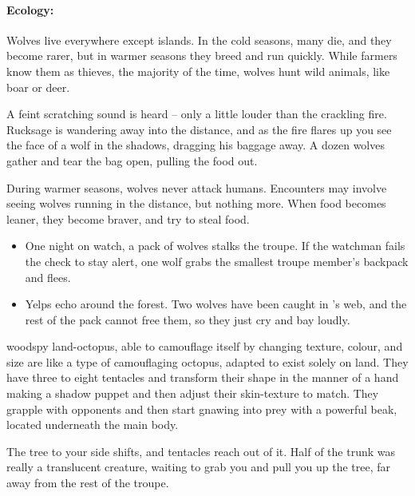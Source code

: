 \begin{multicols}{2}
\paragraph{Ecology:} Wolves live everywhere except islands.
In the cold seasons, many die, and they become rarer, but in warmer seasons they breed and run quickly.
While farmers know them as thieves, the majority of the time, wolves hunt wild animals, like boar or deer.

\begin{boxtext}
  A feint scratching sound is heard -- only a little louder than the crackling fire.
  Rucksage is wandering away into the distance, and as the fire flares up you see the face of a wolf in the shadows, dragging his baggage away.
  A dozen wolves gather and tear the bag open, pulling the food out.
\end{boxtext}


\showEnc
During warmer seasons, wolves never attack humans.
Encounters may involve seeing wolves running in the distance, but nothing more.
When food becomes leaner, they become braver, and try to steal food.

\begin{itemize}
  \item
  One night on watch, a pack of wolves stalks the troupe.
  If the watchman fails the  check to stay alert, one wolf grabs the smallest troupe member's backpack and flees.
  \item
  Yelps echo around the forest.
    Two wolves have been caught in 's web, and the rest of the pack cannot free them, so they just cry and bay loudly.
\end{itemize}

  {woodspy}%
  {land-octopus, able to camouflage itself by changing texture, colour, and size}%
are like a type of camouflaging octopus, adapted to exist solely on land.
They have three to eight tentacles and transform their shape in the manner of a hand making a shadow puppet and then adjust their skin-texture to match.
They grapple with opponents and then start gnawing into prey with a powerful beak, located underneath the main body.

\begin{boxtext}
  The tree to your side shifts, and tentacles reach out of it.
  Half of the trunk was really a translucent creature, waiting to grab you and pull you up the tree, far away from the rest of the troupe.
\end{boxtext}


\end{multicols}
